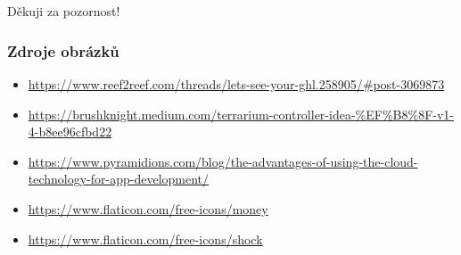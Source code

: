 \documentclass[%
  12pt,       				%
	t,                  %
	aspectratio=1610,   %
	unicode,						%
]{beamer}				    	%
\begin{document}
\begin{frame}[c] 
	\frametitle{\mbox{ }}
	\begin{center}
		{\Huge Děkuji za pozornost!}
	\end{center}
\end{frame}


\begin{frame} [fragile]
	\frametitle{Zdroje obrázků}
	\begin{itemize}
		\item \url{https://www.reef2reef.com/threads/lets-see-your-ghl.258905/#post-3069873}
		\item \url{https://brushknight.medium.com/terrarium-controller-idea-%EF%B8%8F-v1-4-b8ee96cfbd22}
		\item \url{https://www.pyramidions.com/blog/the-advantages-of-using-the-cloud-technology-for-app-development/}
		\item \url{https://www.flaticon.com/free-icons/money}
		\item \url{https://www.flaticon.com/free-icons/shock}
	\end{itemize}			
\end{frame}
\end{document}
